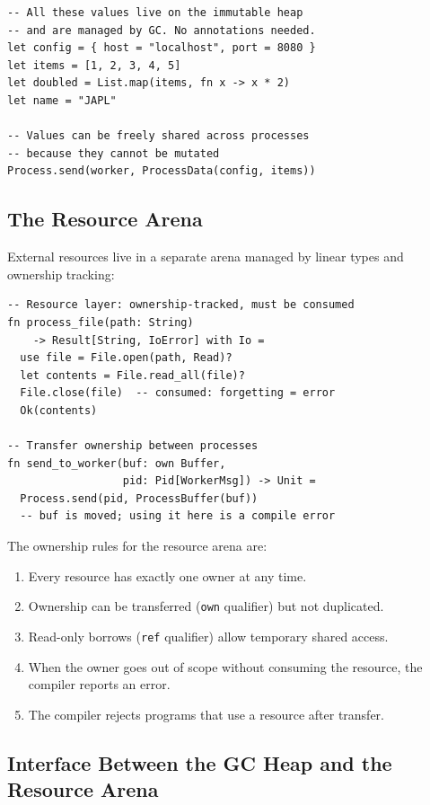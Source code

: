 \documentclass[11pt,twocolumn]{article}
\begin{document}
\begin{lstlisting}
-- All these values live on the immutable heap
-- and are managed by GC. No annotations needed.
let config = { host = "localhost", port = 8080 }
let items = [1, 2, 3, 4, 5]
let doubled = List.map(items, fn x -> x * 2)
let name = "JAPL"

-- Values can be freely shared across processes
-- because they cannot be mutated
Process.send(worker, ProcessData(config, items))
\end{lstlisting}

\subsection{The Resource Arena}

External resources live in a separate arena managed by linear types and ownership tracking:

\begin{lstlisting}
-- Resource layer: ownership-tracked, must be consumed
fn process_file(path: String)
    -> Result[String, IoError] with Io =
  use file = File.open(path, Read)?
  let contents = File.read_all(file)?
  File.close(file)  -- consumed: forgetting = error
  Ok(contents)

-- Transfer ownership between processes
fn send_to_worker(buf: own Buffer,
                  pid: Pid[WorkerMsg]) -> Unit =
  Process.send(pid, ProcessBuffer(buf))
  -- buf is moved; using it here is a compile error
\end{lstlisting}

The ownership rules for the resource arena are:
\begin{enumerate}
\item Every resource has exactly one owner at any time.
\item Ownership can be transferred (\texttt{own} qualifier) but not duplicated.
\item Read-only borrows (\texttt{ref} qualifier) allow temporary shared access.
\item When the owner goes out of scope without consuming the resource, the compiler reports an error.
\item The compiler rejects programs that use a resource after transfer.
\end{enumerate}

\subsection{Interface Between the GC Heap and the Resource Arena}
\end{document}
